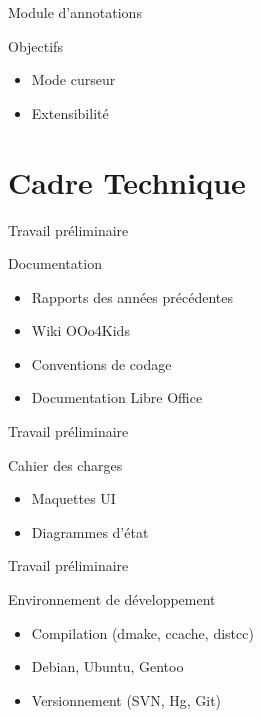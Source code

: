 \documentclass[handout]{beamer}
\begin{document}
\begin{frame}{Module d'annotations}
    \begin{block}{Objectifs}
        \begin{itemize}[<+->]
            \item Mode curseur
            \item Extensibilité
        \end{itemize}
    \end{block}
\end{frame}

\section{Cadre Technique}

\begin{frame}{Travail préliminaire}
    \begin{block}{Documentation}
        \begin{itemize}[<+->]
            \item Rapports des années précédentes
            \item Wiki OOo4Kids
            \item Conventions de codage
            \item Documentation Libre Office
        \end{itemize}
    \end{block}
\end{frame}

\begin{frame}{Travail préliminaire}
    \begin{block}{Cahier des charges}
        \begin{itemize}[<+->]
            \item Maquettes UI
            \item Diagrammes d'état
        \end{itemize}
    \end{block}
\end{frame}

\begin{frame}{Travail préliminaire}
    \begin{block}{Environnement de développement}
        \begin{itemize}[<+->]
            \item Compilation (dmake, ccache, distcc)
            \item Debian, Ubuntu, Gentoo
            \item Versionnement (SVN, Hg, Git)
        \end{itemize}
    \end{block}
\end{frame}
\end{document}
